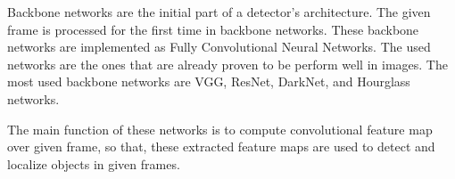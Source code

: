 \documentclass{article}
\begin{document}
\setlength{\parindent}{6ex}

\indent

Backbone networks are the initial part of a detector's architecture.
The given frame is processed for the first time in backbone networks.
These backbone networks are implemented as Fully Convolutional Neural
Networks. The used networks are the ones that are already proven to be 
perform well in images. The most used backbone networks are 
VGG, ResNet, DarkNet, and Hourglass networks.
\indent

The main function of these networks is to compute convolutional feature map
over given frame, so that, these extracted feature maps are used to detect 
and localize objects in given frames.
\end{document}
